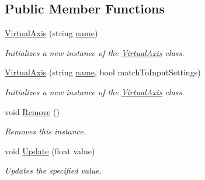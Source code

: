 \subsection*{Public Member Functions}
\begin{DoxyCompactItemize}
\item 
\hyperlink{class_lerp2_assets_1_1_cross_platform_input_1_1_cross_platform_input_manager_1_1_virtual_axis_ad42d061e1d7fa3fd5bf682c18b785ba1}{Virtual\+Axis} (string \hyperlink{class_lerp2_assets_1_1_cross_platform_input_1_1_cross_platform_input_manager_1_1_virtual_axis_afe53ae5555c8ef0901ae2fca3a3da6f0}{name})
\begin{DoxyCompactList}\small\item\em Initializes a new instance of the \hyperlink{class_lerp2_assets_1_1_cross_platform_input_1_1_cross_platform_input_manager_1_1_virtual_axis}{Virtual\+Axis} class. \end{DoxyCompactList}\item 
\hyperlink{class_lerp2_assets_1_1_cross_platform_input_1_1_cross_platform_input_manager_1_1_virtual_axis_ab34abf8f004ae20129a7f48e06efea0e}{Virtual\+Axis} (string \hyperlink{class_lerp2_assets_1_1_cross_platform_input_1_1_cross_platform_input_manager_1_1_virtual_axis_afe53ae5555c8ef0901ae2fca3a3da6f0}{name}, bool match\+To\+Input\+Settings)
\begin{DoxyCompactList}\small\item\em Initializes a new instance of the \hyperlink{class_lerp2_assets_1_1_cross_platform_input_1_1_cross_platform_input_manager_1_1_virtual_axis}{Virtual\+Axis} class. \end{DoxyCompactList}\item 
void \hyperlink{class_lerp2_assets_1_1_cross_platform_input_1_1_cross_platform_input_manager_1_1_virtual_axis_ab9bb47cd099d82f6dccaf638b7fc0ddf}{Remove} ()
\begin{DoxyCompactList}\small\item\em Removes this instance. \end{DoxyCompactList}\item 
void \hyperlink{class_lerp2_assets_1_1_cross_platform_input_1_1_cross_platform_input_manager_1_1_virtual_axis_a0c7aed6ca92c28da0047b0f82f3d9e98}{Update} (float value)
\begin{DoxyCompactList}\small\item\em Updates the specified value. \end{DoxyCompactList}\end{DoxyCompactItemize}
